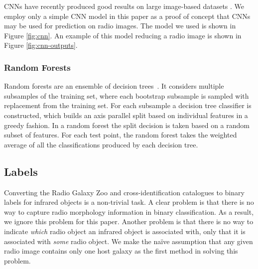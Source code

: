 \documentclass[fleqn,usenatbib,usedcolumn]{mnras}
\begin{document}
      CNNs have recently produced good results on large image-based datasets
      \citep[e.g.][]{dieleman15cnn}. We employ only a simple CNN
      model in this paper as a proof of concept that CNNs may be used for
      prediction on radio images. The model we used is shown in Figure
      \ref{fig:cnn}. An example of this model reducing a radio image is shown
      in Figure \ref{fig:cnn-outputs}.

    \subsubsection{Random Forests}
    \label{sec:random-forests}

      Random forests are an ensemble of decision
      trees~\citep{breiman01random-forest}. It considers multiple subsamples
      of the training set, where each bootstrap subsample is sampled with
      replacement from the training set. For each subsample a decision tree
      classifier is constructed, which builds an axis parallel split based on
      individual features in a greedy fashion. In a random forest the split
      decision is taken based on a random subset of features. For each test
      point, the random forest takes the weighted average of all the
      classifications produced by each decision tree.

  \subsection{Labels}\label{labels}

    Converting the Radio Galaxy Zoo and \citet{norris06} cross-identification
    catalogues to binary labels for infrared objects is a non-trivial task. A
    clear problem is that there is no way to capture radio morphology
    information in binary classification. As a result, we ignore this problem
    for this paper. Another problem is that there is no way to indicate
    \emph{which} radio object an infrared object is associated with, only that
    it is associated with \emph{some} radio object. We make the na\"ive
    assumption that any given radio image contains only one host galaxy as the
    first method in solving this problem.
\end{document}
